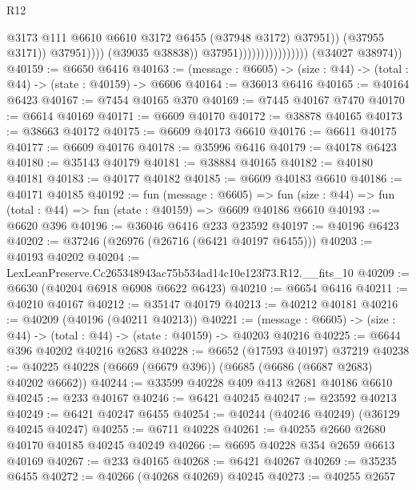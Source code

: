 \begin{lexlean}{R12}
\begin{coremodule}
                                                      @3173
                                                      @111
                                                      @6610
                                                      @6610
                                                      @3172
                                                      @6455
                                                      (@37948 @3172)
                                                      @37951))
                                                  (@37955 @3171))
                                                @37951))))
                                        (@39035 @38838))
                                      @37951))))))))))))))))
      (@34027 @38974))
@40159 := @6650 @6416
@40163 := (message : @6605) -> (size : @44) -> (total : @44) -> (state : @40159) -> @6606
@40164 := @36013 @6416
@40165 := @40164 @6423
@40167 := @7454 @40165 @370
@40169 := @7445 @40167 @7470
@40170 := @6614 @40169
@40171 := @6609 @40170
@40172 := @38878 @40165
@40173 := @38663 @40172
@40175 := @6609 @40173 @6610
@40176 := @6611 @40175
@40177 := @6609 @40176
@40178 := @35996 @6416
@40179 := @40178 @6423
@40180 := @35143 @40179
@40181 := @38884 @40165
@40182 := @40180 @40181
@40183 := @40177 @40182
@40185 := @6609 @40183 @6610
@40186 := @40171 @40185
@40192 := fun (message : @6605) =>
  fun (size : @44) => fun (total : @44) => fun (state : @40159) => @6609 @40186 @6610
@40193 := @6620 @396
@40196 := @36046 @6416 @233 @23592
@40197 := @40196 @6423
@40202 := @37246 (@26976 (@26716 (@6421 @40197 @6455)))
@40203 := @40193 @40202
@40204 := LexLeanPreserve.Cc265348943ac75b534ad14c10e123f73.R12.__fits_10
@40209 := @6630 (@40204 @6918 @6908 @6622 @6423)
@40210 := @6654 @6416
@40211 := @40210 @40167
@40212 := @35147 @40179
@40213 := @40212 @40181
@40216 := @40209 (@40196 (@40211 @40213))
@40221 := (message : @6605) -> (size : @44) -> (total : @44) -> (state : @40159) -> @40203 @40216
@40225 := @6644 @396 @40202 @40216 @2683
@40228 := @6652 (@17593 @40197) @37219
@40238 := @40225 @40228 (@6669 (@6679 @396)) (@6685 (@6686 (@6687 @2683) @40202 @6662))
@40244 := @33599 @40228 @409 @413 @2681 @40186 @6610
@40245 := @233 @40167
@40246 := @6421 @40245
@40247 := @23592 @40213
@40249 := @6421 @40247 @6455
@40254 := @40244 (@40246 @40249) (@36129 @40245 @40247)
@40255 := @6711 @40228
@40261 := @40255 @2660 @2680 @40170 @40185 @40245 @40249
@40266 := @6695 @40228 @354 @2659 @6613 @40169
@40267 := @233 @40165
@40268 := @6421 @40267
@40269 := @35235 @6455
@40272 := @40266 (@40268 @40269) @40245
@40273 := @40255 @2657

\end{coremodule}
\end{lexlean}

